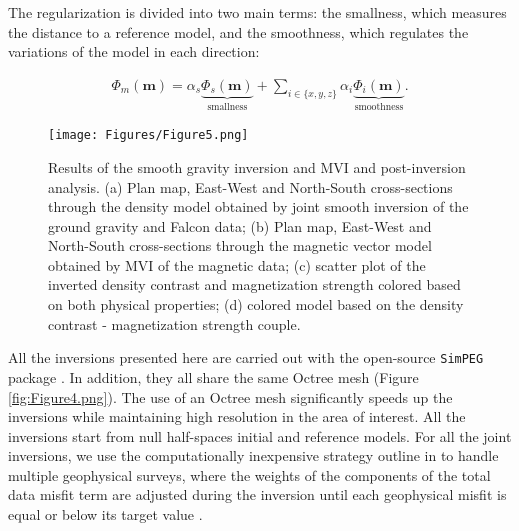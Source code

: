 \documentclass[paper, twocolumn]{geophysics} %
\begin{document}
The regularization is divided into two main terms: the smallness, which measures the distance to a reference model, and the smoothness, which regulates the variations of the model in each direction:

\begin{align}
\Phi_{m}(\mathbf{m})= \alpha_s \underbrace{\Phi_{s}(\mathbf{m})}_{\text{smallness}} + \sum_{i\in{\{x,y,z\}}}\alpha_i\underbrace{\Phi_{i}(\mathbf{m})}_{\text{smoothness}}. \label{regularizer}
\end{align}


\begin{figure*}
\centering
\texttt{[image: Figures/Figure5.png]}
\caption{Results of the smooth gravity inversion and MVI and post-inversion analysis. (a) Plan map, East-West and North-South cross-sections through the density model obtained by joint smooth inversion of the ground gravity and Falcon data; (b) Plan map, East-West and North-South cross-sections through the magnetic vector model obtained by MVI of the magnetic data; (c) scatter plot of the inverted density contrast and magnetization strength colored based on both physical properties; (d) colored model based on the density contrast - magnetization strength couple.}
\label{fig:Figure5.png}
\end{figure*}

All the inversions presented here are carried out with the open-source \texttt{SimPEG} package \citep{Cockett2015}. In addition, they all share the same Octree mesh (Figure \ref{fig:Figure4.png}). The use of an Octree mesh significantly speeds up the inversions while maintaining high resolution in the area of interest. All the inversions start from null half-spaces initial and reference models. For all the joint inversions, we use the computationally inexpensive strategy outline in \citet{AsticJoint} to handle multiple geophysical surveys, where the weights of the components of the total data misfit term are adjusted during the inversion until each geophysical misfit is equal or below its target value \citep{Parker}.
\end{document}
